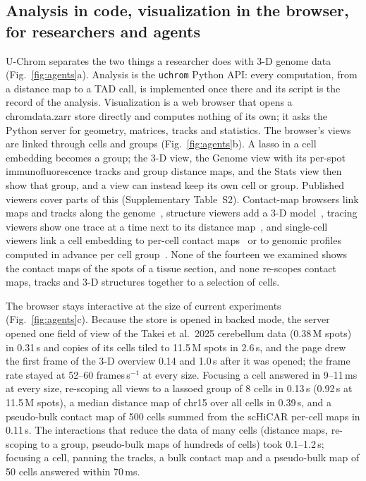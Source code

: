 \documentclass[11pt]{article}
\newcommand{\pkg}[1]{\texttt{#1}}
\begin{document}
\subsection*{Analysis in code, visualization in the browser, for researchers and agents}
U-Chrom separates the two things a researcher does with 3-D genome data (Fig.~\ref{fig:agents}a).
Analysis is the \pkg{uchrom} Python API: every computation, from a distance map to a TAD call, is implemented once there and its script is the record of the analysis.
Visualization is a web browser that opens a chromdata.zarr store directly and computes nothing of its own; it asks the Python server for geometry, matrices, tracks and statistics.
The browser's views are linked through cells and groups (Fig.~\ref{fig:agents}b).
A lasso in a cell embedding becomes a group; the 3-D view, the Genome view with its per-spot immunofluorescence tracks and group distance maps, and the Stats view then show that group, and a view can instead keep its own cell or group.
Published viewers cover parts of this (Supplementary Table~S2).
Contact-map browsers link maps and tracks along the genome~\citep{higlass,juiceboxjs,threedgb2,washu2022}, structure viewers add a 3-D model~\citep{washu3d,hicube,fourdgb}, tracing viewers show one trace at a time next to its distance map~\citep{spacewalk,olive}, and single-cell viewers link a cell embedding to per-cell contact maps~\citep{higashi} or to genomic profiles computed in advance per cell group~\citep{vitessce,sgs}.
None of the fourteen we examined shows the contact maps of the spots of a tissue section, and none re-scopes contact maps, tracks and 3-D structures together to a selection of cells.

The browser stays interactive at the size of current experiments (Fig.~\ref{fig:agents}c).
Because the store is opened in backed mode, the server opened one field of view of the Takei et al.\ 2025 cerebellum data (0.38\,M spots) in 0.31\,s and copies of its cells tiled to 11.5\,M spots in 2.6\,s, and the page drew the first frame of the 3-D overview 0.14 and 1.0\,s after it was opened; the frame rate stayed at 52--60 frames\,s$^{-1}$ at every size.
Focusing a cell answered in 9--11\,ms at every size, re-scoping all views to a lassoed group of 8 cells in 0.13\,s (0.92\,s at 11.5\,M spots), a median distance map of chr15 over all cells in 0.39\,s, and a pseudo-bulk contact map of 500 cells summed from the scHiCAR per-cell maps in 0.11\,s.
The interactions that reduce the data of many cells (distance maps, re-scoping to a group, pseudo-bulk maps of hundreds of cells) took 0.1--1.2\,s; focusing a cell, panning the tracks, a bulk contact map and a pseudo-bulk map of 50 cells answered within 70\,ms.
\end{document}

